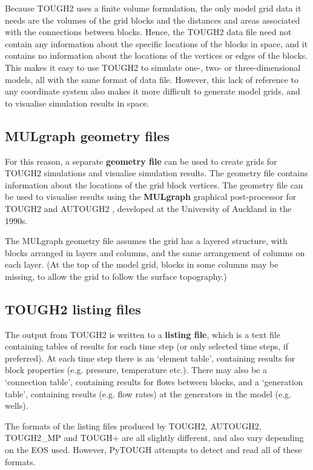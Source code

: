 Because TOUGH2 uses a finite volume formulation, the only model grid data it needs are the volumes of the grid blocks and the distances and areas associated with the connections between blocks.  Hence, the TOUGH2 data file need not contain any information about the specific locations of the blocks in space, and it contains no information about the locations of the vertices or edges of the blocks.  This makes it easy to use TOUGH2 to simulate one-, two- or three-dimensional models, all with the same format of data file.  However, this lack of reference to any coordinate system also makes it more difficult to generate model grids, and to visualise simulation results in space.

\subsection{MULgraph geometry files}

For this reason, a separate \textbf{geometry file} can be used to create grids for TOUGH2 simulations and visualise simulation results.  The geometry file contains information about the locations of the grid block vertices.  The geometry file can be used to visualise results using the \textbf{MULgraph} graphical post-processor for TOUGH2 and AUTOUGH2 \citep{mulgraph}, developed at the University of Auckland in the 1990s.

The MULgraph geometry file assumes the grid has a layered structure, with blocks arranged in layers and columns, and the same arrangement of columns on each layer.  (At the top of the model grid, blocks in some columns may be missing, to allow the grid to follow the surface topography.)

\subsection{TOUGH2 listing files}

The output from TOUGH2 is written to a \textbf{listing file}, which is a text file containing tables of results for each time step (or only selected time steps, if preferred).  At each time step there is an `element table', containing results for block properties (e.g. pressure, temperature etc.).  There may also be a `connection table', containing results for flows between blocks, and a `generation table', containing results (e.g. flow rates) at the generators in the model (e.g. wells).

The formats of the listing files produced by TOUGH2, AUTOUGH2, TOUGH2\_MP and TOUGH+ are all slightly different, and also vary depending on the EOS used.  However, PyTOUGH attempts to detect and read all of these formats.

